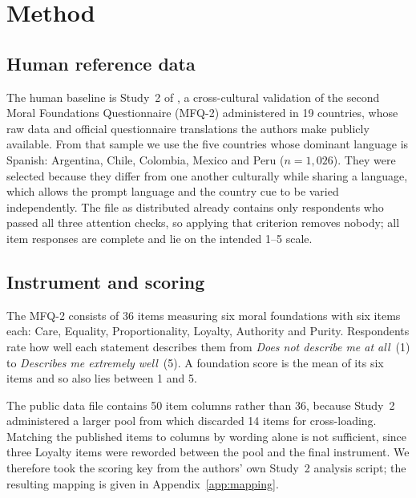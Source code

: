 
\section{Method}
\label{sec:methodology}

\subsection{Human reference data}
\label{subsec:humandata}

The human baseline is Study~2 of \textcite{atari2023weird}, a cross-cultural
validation of the second Moral Foundations Questionnaire (MFQ-2) administered in
19 countries, whose raw data and official questionnaire translations the authors
make publicly available. From that sample we use the five countries whose
dominant language is Spanish: Argentina, Chile, Colombia, Mexico and Peru
($n = 1{,}026$). They were selected because they differ from one another
culturally while sharing a language, which allows the prompt language and the
country cue to be varied independently. The file as distributed already contains
only respondents who passed all three attention checks, so applying that
criterion removes nobody; all item responses are complete and lie on the intended
1--5 scale.

\subsection{Instrument and scoring}
\label{subsec:instrument}

The MFQ-2 consists of 36 items measuring six moral foundations with six items
each: Care, Equality, Proportionality, Loyalty, Authority and Purity. Respondents
rate how well each statement describes them from \emph{Does not describe me at
all}~(1) to \emph{Describes me extremely well}~(5). A foundation score is the
mean of its six items and so also lies between 1 and 5.

The public data file contains 50 item columns rather than 36, because Study~2
administered a larger pool from which \textcite{atari2023weird} discarded 14
items for cross-loading. Matching the published items to columns by wording alone
is not sufficient, since three Loyalty items were reworded between the pool and
the final instrument. We therefore took the scoring key from the authors' own
Study~2 analysis script; the resulting mapping is given in
Appendix~\ref{app:mapping}.

